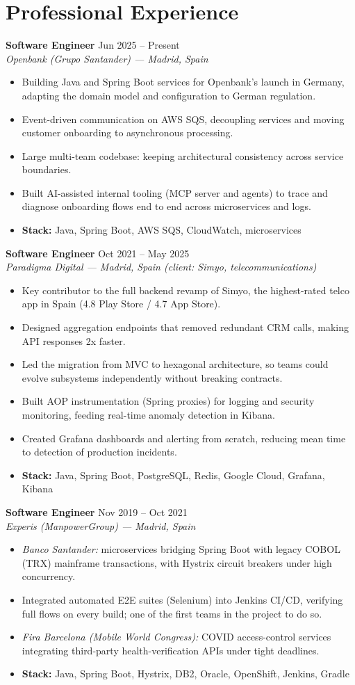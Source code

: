 \documentclass[a4paper,9pt]{extarticle}
\newcommand{\entrada}[4]{%
  \Needspace{5\baselineskip}%
  \noindent
  \textbf{#1} \hfill {\small\color{gris}#3}\\[0.05em]
  {\color{gris}\textit{#2}}%
  \begin{itemize}[
    leftmargin=1.1em,
    topsep=0.1em,
    itemsep=0.03em,
    parsep=0em,
    partopsep=0em
  ]
    #4
  \end{itemize}
  \vspace{0.1em}
}
\newcommand{\stack}[1]{\item[] {\footnotesize\color{gris}\textbf{Stack:} #1}}
\begin{document}
\section{Professional Experience}

\entrada
  {Software Engineer}
  {Openbank (Grupo Santander) --- Madrid, Spain}
  {Jun 2025 -- Present}
  {
    \item Building Java and Spring Boot services for Openbank's launch in Germany, adapting the domain model and configuration to German regulation.
    \item Event-driven communication on AWS SQS, decoupling services and moving customer onboarding to asynchronous processing.
    \item Large multi-team codebase: keeping architectural consistency across service boundaries.
    \item Built AI-assisted internal tooling (MCP server and agents) to trace and diagnose onboarding flows end to end across microservices and logs.
    \stack{Java, Spring Boot, AWS SQS, CloudWatch, microservices}
  }

\entrada
  {Software Engineer}
  {Paradigma Digital --- Madrid, Spain (client: Simyo, telecommunications)}
  {Oct 2021 -- May 2025}
  {
    \item Key contributor to the full backend revamp of Simyo, the highest-rated telco app in Spain (4.8 Play Store / 4.7 App Store).
    \item Designed aggregation endpoints that removed redundant CRM calls, making API responses 2x faster.
    \item Led the migration from MVC to hexagonal architecture, so teams could evolve subsystems independently without breaking contracts.
    \item Built AOP instrumentation (Spring proxies) for logging and security monitoring, feeding real-time anomaly detection in Kibana.
    \item Created Grafana dashboards and alerting from scratch, reducing mean time to detection of production incidents.
    \stack{Java, Spring Boot, PostgreSQL, Redis, Google Cloud, Grafana, Kibana}
  }

\entrada
  {Software Engineer}
  {Experis (ManpowerGroup) --- Madrid, Spain}
  {Nov 2019 -- Oct 2021}
  {
    \item \textit{Banco Santander:} microservices bridging Spring Boot with legacy COBOL (TRX) mainframe transactions, with Hystrix circuit breakers under high concurrency.
    \item Integrated automated E2E suites (Selenium) into Jenkins CI/CD, verifying full flows on every build; one of the first teams in the project to do so.
    \item \textit{Fira Barcelona (Mobile World Congress):} COVID access-control services integrating third-party health-verification APIs under tight deadlines.
    \stack{Java, Spring Boot, Hystrix, DB2, Oracle, OpenShift, Jenkins, Gradle}
  }
\end{document}
